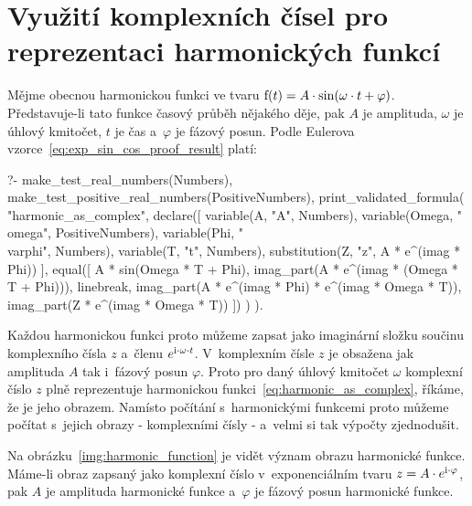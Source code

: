 \section{Využití komplexních čísel pro reprezentaci harmonických funkcí}

Mějme obecnou harmonickou funkci ve tvaru \(\mathrm{f}(t) = A \cdot \sin(\omega \cdot t + \varphi)\). Představuje-li tato funkce časový průběh nějakého děje, pak \(A\) je amplituda, \(\omega\) je úhlový kmitočet, \(t\) je čas a~\(\varphi\) je fázový posun. Podle Eulerova vzorce~\eqref{eq:exp_sin_cos_proof_result} platí:

\begin{prolog}
?-	make_test_real_numbers(Numbers),
	make_test_positive_real_numbers(PositiveNumbers),
	print_validated_formula(
		"harmonic_as_complex",
		declare([
			variable(A, "A", Numbers),
			variable(Omega, "\\omega", PositiveNumbers),
			variable(Phi, "\\varphi", Numbers),
			variable(T, "t", Numbers),
			substitution(Z, "z", A * e^(imag * Phi))
		],
			equal([
				A * sin(Omega * T + Phi),
				imag_part(A * e^(imag * (Omega * T + Phi))),
				linebreak,
				imag_part(A * e^(imag * Phi) * e^(imag * Omega * T)),
				imag_part(Z * e^(imag * Omega * T))
			])
		)
	).
\end{prolog}

Každou harmonickou funkci proto můžeme zapsat jako imaginární složku součinu komplexního čísla \(z\) a~členu \(e^{\mathrm{i} \cdot \omega \cdot t}\). V~komplexním čísle \(z\) je obsažena jak amplituda \(A\) tak i~fázový posun \(\varphi\). Proto pro daný úhlový kmitočet \(\omega\) komplexní číslo \(z\) plně reprezentuje harmonickou funkci~\eqref{eq:harmonic_as_complex}, říkáme, že je jeho obrazem. Namísto počítání s~harmonickými funkcemi proto můžeme počítat s~jejich obrazy - komplexními čísly - a~velmi si tak výpočty zjednodušit. 

Na obrázku~\ref{img:harmonic_function} je vidět význam obrazu harmonické funkce. Máme-li obraz zapsaný jako komplexní číslo v~exponenciálním tvaru \(z = A \cdot e^{\mathrm{i} \cdot \varphi}\), pak \(A\) je amplituda harmonické funkce a~\(\varphi\) je fázový posun harmonické funkce.

